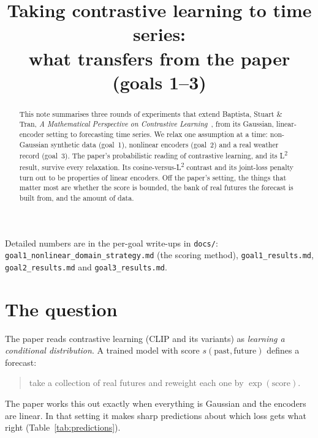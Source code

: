 \documentclass[11pt]{article}
\title{Taking contrastive learning to time series:\\what transfers from the paper (goals 1--3)}
\author{}
\date{}
\newcommand{\Ltwo}{L\textsuperscript{2}}
\begin{document}
\maketitle

\begin{abstract}
\noindent
This note summarises three rounds of experiments that extend Baptista, Stuart \& Tran,
\emph{A Mathematical Perspective on Contrastive Learning}~\cite{bst}, from its Gaussian,
linear-encoder setting to forecasting time series. We relax one assumption at a time:
non-Gaussian synthetic data (goal~1), nonlinear encoders (goal~2) and a real weather
record (goal~3). The paper's probabilistic reading of contrastive learning, and its
\Ltwo{} result, survive every relaxation. Its cosine-versus-\Ltwo{} contrast and its
joint-loss penalty turn out to be properties of linear encoders. Off the paper's
setting, the things that matter most are whether the score is bounded, the bank of
real futures the forecast is built from, and the amount of data.
\end{abstract}

\noindent
Detailed numbers are in the per-goal write-ups in \texttt{docs/}:
\texttt{goal1\_nonlinear\_domain\_strategy.md} (the scoring method),
\texttt{goal1\_results.md}, \texttt{goal2\_results.md} and \texttt{goal3\_results.md}.

\section{The question}

The paper reads contrastive learning (CLIP and its variants) as \emph{learning a
conditional distribution}. A trained model with score $s(\text{past},\text{future})$
defines a forecast:
\begin{quote}
take a collection of real futures and reweight each one by $\exp(\text{score})$.
\end{quote}
The paper works this out exactly when everything is Gaussian and the encoders are
linear. In that setting it makes sharp predictions about which loss gets what right
(Table~\ref{tab:predictions}).
\end{document}
